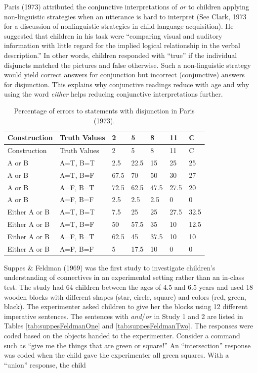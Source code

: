 \documentclass[oneside]{report}
\theoremstyle{definition}
\theoremstyle{definition}
\theoremstyle{definition}
\theoremstyle{remark}
\begin{document}
Paris (1973) attributed the conjunctive interpretations of \emph{or} to
children applying non-linguistic strategies when an utterance is hard to
interpret (See Clark, 1973 for a discussion of nonlinguistic strategies
in child language acquisition). He suggested that children in his task
were ``comparing visual and auditory information with little regard for
the implied logical relationship in the verbal description.'' In other
words, children responded with ``true'' if the individual disjuncts
matched the pictures and false otherwise. Such a non-linguistic strategy
would yield correct answers for conjunction but incorrect (conjunctive)
answers for disjunction. This explains why conjunctive readings reduce
with age and why using the word \emph{either} helps reducing conjunctive
interpretations further.
\begin{longtable}[]{@{}lllllll@{}}
\caption{\label{tab:ParisTable} Percentage of errors to statements with
disjunction in Paris (1973).}\tabularnewline
\toprule
Construction & Truth Values & 2 & 5 & 8 & 11 & C\tabularnewline
\midrule
\endfirsthead
\toprule
Construction & Truth Values & 2 & 5 & 8 & 11 & C\tabularnewline
\midrule
\endhead
A or B & A=T, B=T & 2.5 & 22.5 & 15 & 25 & 25\tabularnewline
A or B & A=T, B=F & 67.5 & 70 & 50 & 30 & 27\tabularnewline
A or B & A=F, B=T & 72.5 & 62.5 & 47.5 & 27.5 & 20\tabularnewline
A or B & A=F, B=F & 2.5 & 2.5 & 2.5 & 0 & 0\tabularnewline
Either A or B & A=T, B=T & 7.5 & 25 & 25 & 27.5 & 32.5\tabularnewline
Either A or B & A=T, B=F & 50 & 57.5 & 35 & 10 & 12.5\tabularnewline
Either A or B & A=F, B=T & 62.5 & 45 & 37.5 & 10 & 10\tabularnewline
Either A or B & A=F, B=F & 5 & 17.5 & 10 & 0 & 0\tabularnewline
\bottomrule
\end{longtable}
Suppes \& Feldman (1969) was the first study to investigate children's
understanding of connectives in an experimental setting rather than an
in-class test. The study had 64 children between the ages of 4.5 and 6.5
years and used 18 wooden blocks with different shapes (star, circle,
square) and colors (red, green, black). The experimenter asked children
to give her the blocks using 12 different imperative sentences. The
sentences with \emph{and}/\emph{or} in Study 1 and 2 are listed in
Tables \ref{tab:suppesFeldmanOne} and \ref{tab:suppesFeldmanTwo}. The
responses were coded based on the objects handed to the experimenter.
Consider a command such as ``give me the things that are green or
square!'' An ``intersection'' response was coded when the child gave the
experimenter all green squares. With a ``union'' response, the child
\end{document}
